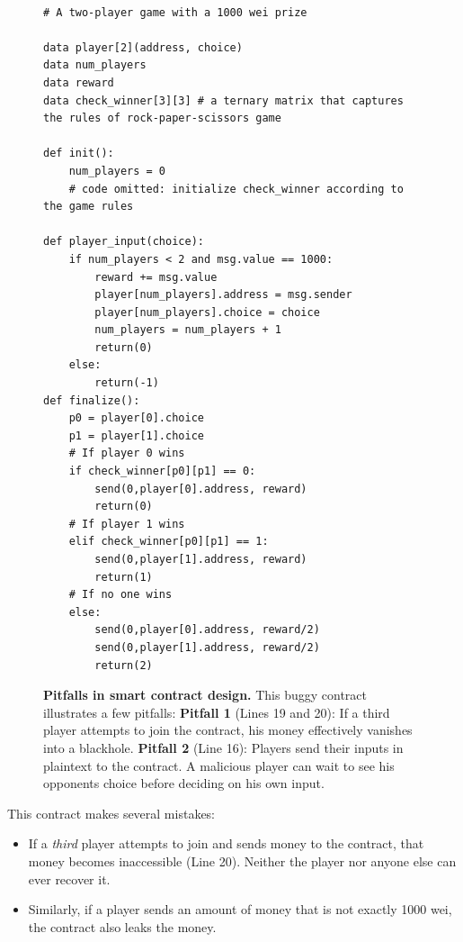 \documentclass{llncs}
\begin{document}
\begin{figure}
\begin{mdframed}
\begin{verbatim}

# A two-player game with a 1000 wei prize

data player[2](address, choice)
data num_players
data reward
data check_winner[3][3] # a ternary matrix that captures the rules of rock-paper-scissors game

def init():
	num_players = 0
	# code omitted: initialize check_winner according to the game rules
	
def player_input(choice):
	if num_players < 2 and msg.value == 1000:
		reward += msg.value
		player[num_players].address = msg.sender
		player[num_players].choice = choice
		num_players = num_players + 1
		return(0)
	else:
		return(-1)
def finalize():
	p0 = player[0].choice
	p1 = player[1].choice
	# If player 0 wins
	if check_winner[p0][p1] == 0:
		send(0,player[0].address, reward)
		return(0)
	# If player 1 wins
	elif check_winner[p0][p1] == 1:
		send(0,player[1].address, reward)
		return(1)
	# If no one wins
	else:
		send(0,player[0].address, reward/2)
		send(0,player[1].address, reward/2)
		return(2)
\end{verbatim}
\end{mdframed}
\caption{
\label{fig:moneyleaks}
{\bf Pitfalls in smart contract design.} This buggy contract illustrates a few pitfalls: \newline
{\bf Pitfall 1} (Lines 19 and 20): If a third player
attempts to join the contract, his
money effectively vanishes into a blackhole. \newline
{\bf Pitfall 2} (Line 16): Players send their inputs 
in plaintext to the contract. A malicious player 
can wait to see his opponents choice before deciding on his own input.
}
\end{figure}


This contract makes several mistakes:
\begin{itemize}[leftmargin=5mm]
\item
If a \emph{third} player attempts to join and sends money to the contract,
that money becomes inaccessible (Line 20). Neither the player nor anyone else can ever recover it.
\item
Similarly, if a player sends an amount of money that is not
exactly 1000 wei,
the contract also leaks the money.
\end{itemize}
\end{document}
